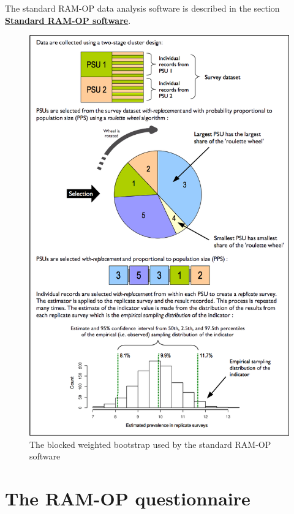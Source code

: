\documentclass[12pt,a4paper]{book}
\theoremstyle{definition}
\theoremstyle{definition}
\theoremstyle{definition}
\theoremstyle{remark}
\begin{document}
The standard RAM-OP data analysis software is described in the section
\protect\hyperlink{software}{\textbf{Standard RAM-OP software}}.

\begin{figure}[H]

{\centering \includegraphics{figures/bbw} 

}

\caption{The blocked weighted bootstrap used by the standard RAM-OP software}\label{fig:indicators31}
\end{figure}

\hypertarget{questionnaire}{%
\chapter{The RAM-OP questionnaire}\label{questionnaire}}
\end{document}
